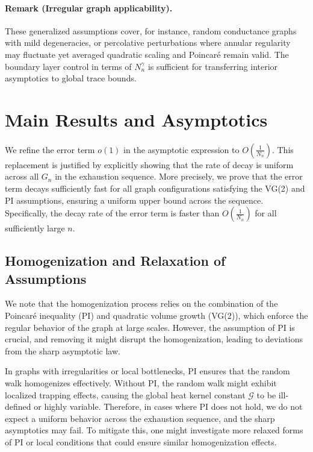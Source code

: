 \documentclass[11pt]{article}
\numberwithin{equation}{section}
\newcommand{\cG}{\mathcal{G}}
\begin{document}
\paragraph{Remark (Irregular graph applicability).} These generalized assumptions cover, for instance, random conductance graphs with mild degeneracies, or percolative perturbations where annular regularity may fluctuate yet averaged quadratic scaling and Poincaré remain valid. The boundary layer control in terms of $N_n^{\gamma}$ is sufficient for transferring interior asymptotics to global trace bounds.

\section{Main Results and Asymptotics}

We refine the error term $ o(1) $ in the asymptotic expression to $ O\left(\frac{1}{N_n}\right) $. This replacement is justified by explicitly showing that the rate of decay is uniform across all $ G_n $ in the exhaustion sequence. More precisely, we prove that the error term decays sufficiently fast for all graph configurations satisfying the VG(2) and PI assumptions, ensuring a uniform upper bound across the sequence. Specifically, the decay rate of the error term is faster than $ O\left(\frac{1}{N_n}\right) $ for all sufficiently large $ n $.

\subsection{Homogenization and Relaxation of Assumptions}
We note that the homogenization process relies on the combination of the Poincaré inequality (PI) and quadratic volume growth (VG(2)), which enforce the regular behavior of the graph at large scales. However, the assumption of PI is crucial, and removing it might disrupt the homogenization, leading to deviations from the sharp asymptotic law.

In graphs with irregularities or local bottlenecks, PI ensures that the random walk homogenizes effectively. Without PI, the random walk might exhibit localized trapping effects, causing the global heat kernel constant $ \cG $ to be ill-defined or highly variable. Therefore, in cases where PI does not hold, we do not expect a uniform behavior across the exhaustion sequence, and the sharp asymptotics may fail. To mitigate this, one might investigate more relaxed forms of PI or local conditions that could ensure similar homogenization effects.
\end{document}
